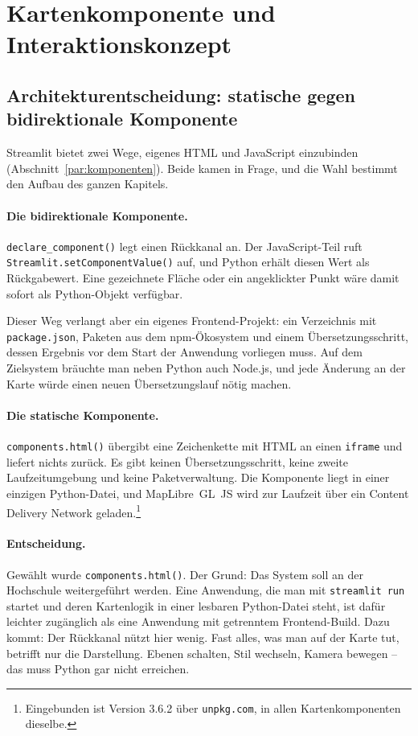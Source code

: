 \documentclass[12pt,a4paper]{report}
\begin{document}
\section{Kartenkomponente und Interaktionskonzept}
\label{sec:kartenvisualisierung}

\subsection{Architekturentscheidung: statische gegen bidirektionale Komponente}
\label{subsec:architekturentscheidung}

Streamlit bietet zwei Wege, eigenes HTML und JavaScript einzubinden
(Abschnitt~\ref{par:komponenten}). Beide kamen in Frage, und die Wahl bestimmt den Aufbau des
ganzen Kapitels.

\paragraph{Die bidirektionale Komponente.} \texttt{declare\_component()} legt einen Rückkanal
an. Der JavaScript-Teil ruft \texttt{Streamlit.setComponentValue()} auf, und Python erhält
diesen Wert als Rückgabewert. Eine gezeichnete Fläche oder ein angeklickter Punkt wäre damit
sofort als Python-Objekt verfügbar.

Dieser Weg verlangt aber ein eigenes Frontend-Projekt: ein Verzeichnis mit
\texttt{package.json}, Paketen aus dem npm-Ökosystem und einem Übersetzungsschritt, dessen
Ergebnis vor dem Start der Anwendung vorliegen muss. Auf dem Zielsystem bräuchte man neben
Python auch Node.js, und jede Änderung an der Karte würde einen neuen Übersetzungslauf nötig
machen.

\paragraph{Die statische Komponente.} \texttt{components.html()} übergibt eine Zeichenkette
mit HTML an einen \texttt{iframe} und liefert nichts zurück. Es gibt keinen
Übersetzungsschritt, keine zweite Laufzeitumgebung und keine Paketverwaltung. Die Komponente
liegt in einer einzigen Python-Datei, und MapLibre~GL~JS wird zur Laufzeit über ein Content
Delivery Network geladen.\footnote{Eingebunden ist Version 3.6.2 über \texttt{unpkg.com}, in
allen Kartenkomponenten dieselbe.}

\paragraph{Entscheidung.} Gewählt wurde \texttt{components.html()}. Der Grund: Das System soll
an der Hochschule weitergeführt werden. Eine Anwendung, die man mit \texttt{streamlit run}
startet und deren Kartenlogik in einer lesbaren Python-Datei steht, ist dafür leichter
zugänglich als eine Anwendung mit getrenntem Frontend-Build. Dazu kommt: Der Rückkanal nützt
hier wenig. Fast alles, was man auf der Karte tut, betrifft nur die Darstellung. Ebenen
schalten, Stil wechseln, Kamera bewegen -- das muss Python gar nicht erreichen.
\end{document}
